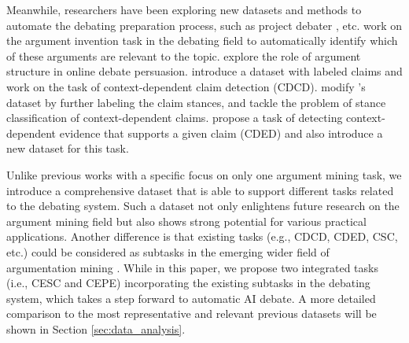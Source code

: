 \documentclass[11pt]{article}
\begin{document}
Meanwhile, researchers have been exploring new datasets and methods to automate the debating preparation process, such as project debater \cite{slonim2021autonomous}, etc.
\citet{bilu2019argument} work on the argument invention task in the debating field to automatically identify which of these arguments are relevant to the topic.
\citet{li2020exploring} explore the role of argument structure in online debate persuasion.
\citet{levy2014context} introduce a dataset with labeled claims and work on the task of context-dependent claim detection (CDCD). 
\citet{bar2017stance} modify \citet{aharoni2014benchmark}'s dataset by further labeling the claim stances, and tackle the problem of stance classification of context-dependent claims.
\citet{rinott2015show} propose a task of detecting context-dependent evidence that supports a given claim (CDED) and also introduce a new dataset for this task.

Unlike previous works with a specific focus on only one argument mining task, we introduce a comprehensive dataset that is able to support different tasks related to the debating system.
Such a dataset not only enlightens future research on the argument mining field but also shows strong potential for various practical applications.
Another difference is that existing tasks (e.g., CDCD, CDED, CSC, etc.) could be considered as subtasks in the emerging wider field of argumentation mining \cite{levy2014context}. 
While in this paper, we propose two integrated tasks (i.e., CESC and CEPE) incorporating the existing subtasks in the debating system, which takes a step forward to automatic AI debate.
A more detailed comparison to the most representative and relevant previous datasets will be shown in Section \ref{sec:data_analysis}.
\end{document}
